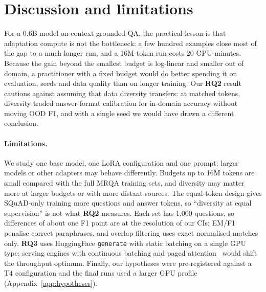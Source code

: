 \documentclass{article}
\newcommand{\RQ}[1]{\textbf{RQ#1}}
\begin{document}
\begin{table}[t]
  \caption{\textbf{Inference ablations.} KV-cache comparisons use a 64-prompt subset; precision comparisons
  use all 512 prompts. Speed-up is default (bf16, KV cache on) over the variant.}
  \label{tab:rq3abl}
  \centering
  \small
  
\end{table}

\section{Discussion and limitations}
\label{sec:discussion}

For a 0.6B model on context-grounded QA, the practical lesson is that adaptation compute is not the
bottleneck: a few hundred examples close most of the gap to a much longer run, and a 16M-token run costs
20 GPU-minutes. Because the gain beyond the smallest budget is log-linear and smaller out of domain, a
practitioner with a fixed budget would do better spending it on evaluation, seeds and data quality than
on longer training. Our \RQ{2} result cautions against assuming that data diversity transfers: at matched
tokens, diversity traded answer-format calibration for in-domain accuracy without moving OOD F1, and with a
single seed we would have drawn a different conclusion.

\paragraph{Limitations.} We study one base model, one LoRA configuration and one prompt; larger models or
other adapters may behave differently. Budgets up to 16M tokens are small compared with the full MRQA
training sets, and diversity may matter more at larger budgets or with more distant sources. The equal-token
design gives SQuAD-only training more questions and answer tokens, so ``diversity at equal supervision'' is
not what \RQ{2} measures. Each set has 1,000 questions, so differences of about one F1 point are at the
resolution of our CIs; EM/F1 penalise correct paraphrases, and overlap filtering uses exact normalised
matches only. \RQ{3} uses HuggingFace \texttt{generate} with static batching on a single GPU type; serving
engines with continuous batching and paged attention~\citep{kwon2023vllm} would shift the throughput optimum.
Finally, our hypotheses were pre-registered against a T4 configuration and the final runs used a larger GPU
profile (Appendix~\ref{app:hypotheses}).
\end{document}
